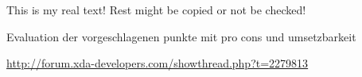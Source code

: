 This is my real text! Rest might be copied or not be checked!


Evaluation der vorgeschlagenen punkte mit pro cons und umsetzbarkeit\newline

\url{http://forum.xda-developers.com/showthread.php?t=2279813}\newline
